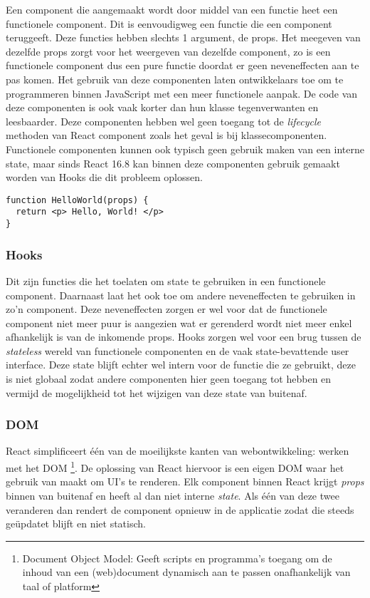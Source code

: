 Een component die aangemaakt wordt door middel van een functie heet een functionele component. Dit is eenvoudigweg een functie die een component teruggeeft. Deze functies hebben slechts 1 argument, de props. Het meegeven van dezelfde props zorgt voor het weergeven van dezelfde component, zo is een functionele component dus een pure functie doordat er geen neveneffecten aan te pas komen. Het gebruik van deze componenten laten ontwikkelaars toe om te programmeren binnen JavaScript met een meer functionele aanpak. De code van deze componenten is ook vaak korter dan hun klasse tegenverwanten en leesbaarder. Deze componenten hebben wel geen toegang tot de \textit{lifecycle} methoden van React component zoals het geval is bij klassecomponenten. Functionele componenten kunnen ook typisch geen gebruik maken van een interne state, maar sinds React 16.8 kan binnen deze componenten gebruik gemaakt worden van Hooks die dit probleem oplossen. 

\begin{lstlisting}[caption=Functionele component]
function HelloWorld(props) {
  return <p> Hello, World! </p>
}
\end{lstlisting}

\subsubsection{Hooks}
Dit zijn functies die het toelaten om state te gebruiken in een functionele component. Daarnaast laat het ook toe om andere neveneffecten te gebruiken in zo'n component. Deze neveneffecten zorgen er wel voor dat de functionele component niet meer puur is aangezien wat er gerenderd wordt niet meer enkel afhankelijk is van de inkomende props. Hooks zorgen wel voor een brug tussen de \textit{stateless} wereld van functionele componenten en de vaak state-bevattende user interface. Deze state blijft echter wel intern voor de functie die ze gebruikt, deze is niet globaal zodat andere componenten hier geen toegang tot hebben en vermijd de mogelijkheid tot het wijzigen van deze state van buitenaf.

\subsubsection{DOM}
React simplificeert één van de moeilijkste kanten van webontwikkeling: werken met het DOM \footnote{Document Object Model: Geeft scripts en programma's toegang om de inhoud van een (web)document dynamisch aan te passen onafhankelijk van taal of platform}. De oplossing van React hiervoor is een eigen DOM waar het gebruik van maakt om UI's te renderen. Elk component binnen React krijgt \textit{props} binnen van buitenaf en heeft al dan niet interne \textit{state}. Als één van deze twee veranderen dan rendert de component opnieuw in de applicatie zodat die steeds geüpdatet blijft en niet statisch. 

